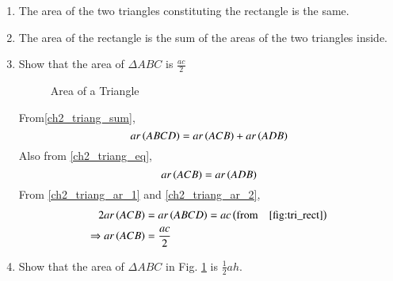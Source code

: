 \begin{enumerate}[label=\arabic*.,ref=\thesubsection.\theenumi]
\item
	The area of the two triangles constituting the rectangle is the same.
	\label{ch2_triang_eq}

\item
	The area of the rectangle is the sum of the areas of the two triangles inside.
	\label{ch2_triang_sum}


\item
\label{prob:ch2_triang_area}
	Show that the area of $\Delta ABC$ is $\frac{ac}{2}$

\begin{figure}[!ht]
	\begin{center}
		
		\resizebox{\columnwidth}{!}{}
	\end{center}
	\caption{Area of a Triangle}
	\label{fig:tri_sss}	
\end{figure}

\solution From\eqref{ch2_triang_sum},
\begin{equation}
\label{ch2_triang_ar_1}
ar\left(ABCD\right) = ar\left(ACB\right) + ar\left(ADB\right)
\end{equation}
Also from \eqref{ch2_triang_eq},
\begin{equation}
\label{ch2_triang_ar_2}
ar\left(ACB\right) = ar\left(ADB\right)
\end{equation}
From \eqref{ch2_triang_ar_1} and \eqref{ch2_triang_ar_2},
\begin{align}
2ar\left(ACB\right) &= ar\left(ABCD\right) = ac \left(\text{from} \quad \eqref{fig:tri_rect}\right)
\\
\Rightarrow ar\left(ACB\right) &= \frac{ac}{2}
\end{align}

\item
	Show that the area of $\Delta ABC$ in Fig. 	\ref{fig:tri_sss}	is $\frac{1}{2}ah$.



\end{enumerate}
